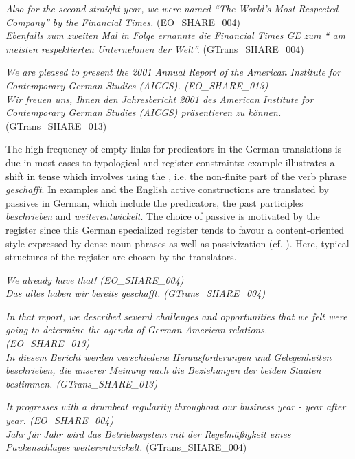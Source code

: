 \documentclass[output=paper]{LSP/langsci}
\begin{document}
\ea \label{ex:culo:4}
   \ea \textit{Also for the second straight year, we were named ``The World's Most Respected Company'' by the Financial Times.} (EO\_SHARE\_004) \\
   \ex 
   \textit{Ebenfalls zum zweiten Mal in Folge ernannte die Financial Times GE zum `` am meisten respektierten Unternehmen der Welt''.} (GTrans\_SHARE\_004)
   \z
\z
 
 
\ea \label{ex:culo:5}
  \ea \textit{We are pleased to present the 2001 Annual Report of the American Institute for   Contemporary German Studies (AICGS). \textup{(EO\_SHARE\_013)}}\\
   \ex \textit{Wir freuen uns, Ihnen den Jahresbericht 2001 des American Institute for Contemporary   German Studies (AICGS) präsentieren zu können.} (GTrans\_SHARE\_013) 
   \z
\z

The high frequency of empty links for predicators in the German translations is due in most cases to typological and register constraints: example  illustrates a shift in tense which involves using the , i.e. the non-finite part of the verb phrase \textit{geschafft}. In examples  and  the English active constructions are translated by passives in German, which include the predicators, the past participles \textit{beschrieben} and \textit{weiterentwickelt}. The choice of passive is motivated by the register since this German specialized register tends to favour a content-oriented style expressed by dense noun phrases as well as passivization (cf. \citealt{Neumann2008}). Here, typical structures of the  register are chosen by the translators. 

\ea \label{ex:culo:6}
  \ea  \textit{We already have that! \textup{(EO\_SHARE\_004)}}\\
   \ex \textit{Das alles haben wir bereits geschafft. \textup{(GTrans\_SHARE\_004)}}
   \z
\z


\ea \label{ex:culo:7}
  \ea \textit{In that report, we described several challenges and opportunities that we felt were   going to determine the agenda of German-American relations. \textup{(EO\_SHARE\_013)}} \\
   \ex \textit{In diesem Bericht werden verschiedene Herausforderungen und Gelegenheiten beschrieben, die unserer Meinung nach die Beziehungen der beiden Staaten bestimmen. \textup{(GTrans\_SHARE\_013)}}
   \z
\z


\ea \label{ex:culo:8}
   \ea \textit{It progresses with a drumbeat regularity throughout our business year - year after year. \textup{(EO\_SHARE\_004)}}\\
    \ex \textit{Jahr für Jahr wird das Betriebssystem mit der Regelmäßigkeit eines Paukenschlages weiterentwickelt.} \textup{(GTrans\_SHARE\_004)} 
    \z
\z
\end{document}

